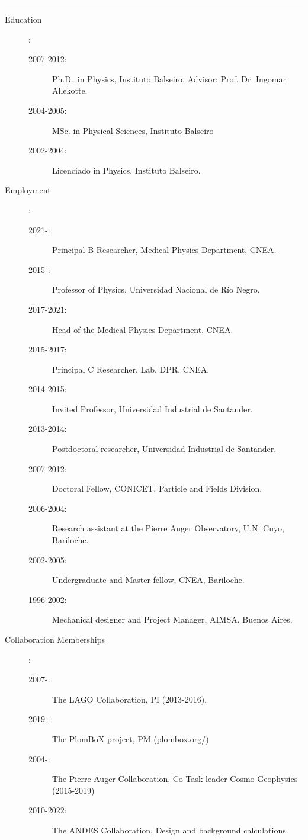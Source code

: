 \documentclass[11pt,a4paper]{article}
\begin{document}
\hrule
  \begin{description}
    \item[Education]:
      \begin{description}
        \item [2007-2012:] Ph.D.\ in Physics, Instituto Balseiro, Advisor: Prof. Dr. Ingomar Allekotte.
        \item [2004-2005:] MSc. in Physical Sciences, Instituto Balseiro
        \item [2002-2004:] Licenciado in Physics, Instituto Balseiro.
    \end{description}
    \item [Employment]:
    \begin{description}
        \item[2021-:~~~~~~~~] Principal B Researcher, Medical Physics Department, CNEA.
        \item[2015-:~~~~~~~~] Professor of Physics, Universidad Nacional de Río Negro.
        \item[2017-2021:] Head of the Medical Physics Department, CNEA.
        \item[2015-2017:] Principal C Researcher, Lab. DPR, CNEA.
        \item[2014-2015:] Invited Professor, Universidad Industrial de Santander.
        \item[2013-2014:] Postdoctoral researcher, Universidad Industrial de Santander.
        \item[2007-2012:] Doctoral Fellow, CONICET, Particle and Fields Division.
        \item[2006-2004:] Research assistant at the Pierre Auger Observatory, U.N. Cuyo, Bariloche.
        \item[2002-2005:] Undergraduate and Master fellow, CNEA, Bariloche.
        \item[1996-2002:] Mechanical designer and Project Manager, AIMSA, Buenos Aires.
    \end{description}
    \item [Collaboration Memberships]:
    \begin{description}
        \item[2007-:~~~~~~~~] The LAGO Collaboration, PI (2013-2016).
        \item[2019-:~~~~~~~~] The PlomBoX project, PM (\href{https://plombox.org/}{plombox.org/})
        \item[2004-:~~~~~~~~] The Pierre Auger Collaboration, Co-Task leader Cosmo-Geophysics (2015-2019)
        \item[2010-2022:] The ANDES Collaboration, Design and background calculations.

\end{description}
\end{description}
\end{document}
